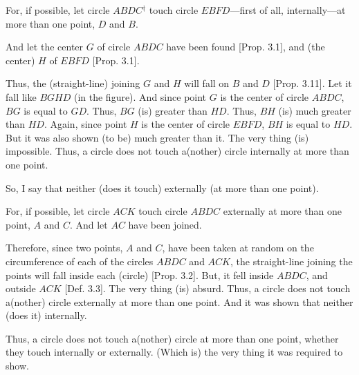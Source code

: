 \begin{Parallel}{}{}
{\epsfysize=2.2in
\centerline{}

For, if possible, let circle $ABDC$$^\dag$ touch circle $EBFD$---first of all, internally---at more than one point, $D$ and $B$.

And let the center $G$ of circle $ABDC$ have been found [Prop. 3.1], and
(the center) $H$ of $EBFD$ [Prop. 3.1].

Thus, the (straight-line) joining $G$ and $H$ will fall on $B$ and $D$ [Prop. 3.11].
Let it fall like $BGHD$ (in the figure). And since point $G$ is the center of
circle $ABDC$, $BG$ is  equal to $GD$. Thus, $BG$ (is) greater than $HD$.
Thus, $BH$ (is) much greater than $HD$. Again, since point $H$ is the
center of circle $EBFD$, $BH$ is equal to $HD$. But it was also shown
(to be) much greater than it. The very thing (is) impossible.
Thus, a circle does not touch a(nother) circle internally at more than one point.

So, I say that neither (does it touch) externally (at more than one point).

For, if possible, let circle $ACK$ touch circle $ABDC$ externally at more
than one point, $A$ and $C$. And let $AC$ have been joined.

Therefore, since  two points, $A$ and $C$,
have been taken at random on the circumference
of each of the circles $ABDC$ and $ACK$, the straight-line joining
the points will fall inside each (circle) [Prop. 3.2]. But, it fell
inside $ABDC$, and outside $ACK$ [Def. 3.3]. The very thing (is) absurd.
Thus, a circle does not touch a(nother) circle externally  at more than one
point. And it was shown that neither (does it) internally.

Thus, a circle does not touch a(nother) circle at more than one point, whether they touch internally or externally. (Which is) the very thing it was required to
show.}
\end{Parallel}


\vspace{7pt}{\footnotesize \noindent$^\dag$ The Greek text has ``$ABCD$'', which is obviously a mistake.}

